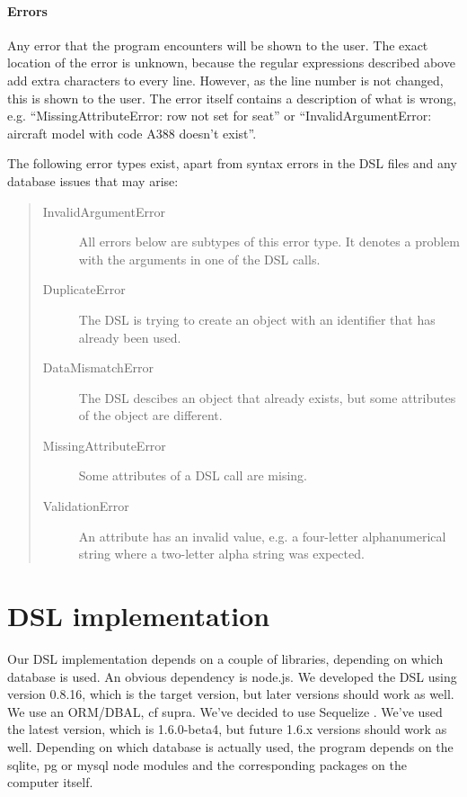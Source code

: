 \documentclass[a4paper,11pt]{article}
\begin{document}
\paragraph*{Errors} Any error that the program encounters will be shown to the user. The exact location of the error is unknown, because the regular expressions described above add extra characters to every line. However, as the line number is not changed, this is shown to the user. The error itself contains a description of what is wrong, e.g. ``MissingAttributeError: row not set for seat'' or ``InvalidArgumentError: aircraft model with code  A388 doesn't exist''.
\par The following error types exist, apart from syntax errors in the DSL files and any database issues that may arise:
\begin{quote}\begin{description}
\item[InvalidArgumentError] All errors below are subtypes of this error type. It denotes a problem with the arguments in one of the DSL calls.
\item[DuplicateError] The DSL is trying to create an object with an identifier that has already been used.
\item[DataMismatchError] The DSL descibes an object that already exists, but some attributes of the object are different.
\item[MissingAttributeError] Some attributes of a DSL call are mising.
\item[ValidationError] An attribute has an invalid value, e.g. a four-letter alphanumerical string where a two-letter alpha string was expected.
\end{description}\end{quote}

\clearpage
\section{DSL implementation}

Our DSL implementation depends on a couple of libraries, depending on which database is used. An obvious dependency is node.js. We developed the DSL using version 0.8.16, which is the target version, but later versions should work as well.
We use an ORM/DBAL, cf supra. We've decided to use Sequelize \citep{sequelize}. We've used the latest version, which is 1.6.0-beta4, but future 1.6.x versions should work as well.
Depending on which database is actually used, the program depends on the sqlite, pg or mysql node modules and the corresponding packages on the computer itself.
\end{document}
